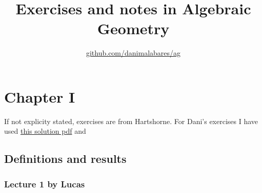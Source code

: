 


\title{Exercises and notes in Algebraic Geometry}

\author{\href{https://github.com/danimalabares/ag}{github.com/danimalabares/ag}}


	\maketitle


\tableofcontents

\chapter{Chapter I}
If not explicity stated, exercises are from Hartshorne. For Dani's exercises I have used \href{https://notes.dzackgarza.com/attachments/Andrew%20Egbert.pdf}{this solution pdf} and 

\section{Definitions and results}


\subsection{Lecture 1 by Lucas}


